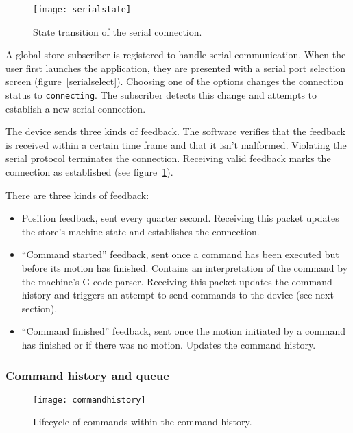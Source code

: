 \begin{figure}[ht]
    \begin{center}
        \texttt{[image: serialstate]}
        \caption{State transition of the serial connection.}
        \label{serialstate}
    \end{center}
\end{figure}

A global store subscriber is registered to handle serial communication. When the
user first launches the application, they are presented with a serial port
selection screen (figure~\ref{serialselect}). Choosing one of the options
changes the connection status to \texttt{connecting}. The subscriber detects
this change and attempts to establish a new serial connection.

The device sends three kinds of feedback. The software verifies that the
feedback is received within a certain time frame and that it isn't malformed.
Violating the serial protocol terminates the connection. Receiving valid
feedback marks the connection as established (see figure~\ref{serialstate}).

There are three kinds of feedback:

\begin{itemize}
    \item Position feedback, sent every quarter second. Receiving this packet
    updates the store's machine state and establishes the connection.
    \item ``Command started'' feedback, sent once a command has been executed
    but before its motion has finished. Contains an interpretation of the
    command by the machine's G-code parser. Receiving this packet updates
    the command history and triggers an attempt to send commands to the device
    (see next section).
    \item ``Command finished'' feedback, sent once the motion initiated by a
    command has finished or if there was no motion. Updates the command history.
\end{itemize}

\subsubsection{Command history and queue}
\label{sending}

\begin{figure}[ht]
    \begin{center}
        \texttt{[image: commandhistory]}
        \caption{Lifecycle of commands within the command history.}
        \label{commandhistory}
    \end{center}
\end{figure}

